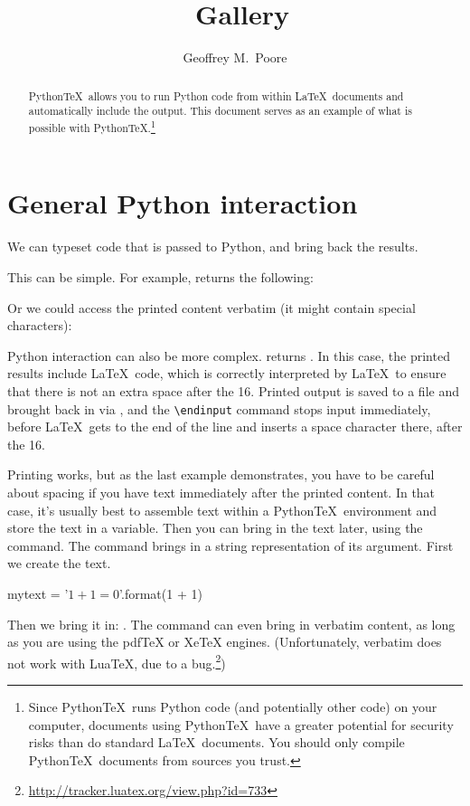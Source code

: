 \documentclass[11pt]{article}
\title{\pytex\ Gallery}
\author{Geoffrey M.\ Poore}
\newcommand{\pytex}{Python\TeX}
\begin{document}
\maketitle


\begin{abstract}
\pytex\ allows you to run Python code from within \LaTeX\ documents and automatically include the output.  This document serves as an example of what is possible with \pytex.\footnote{Since \pytex\ runs Python code (and potentially other code) on your computer, documents using \pytex\ have a greater potential for security risks than do standard \LaTeX\ documents.  You should only compile \pytex\ documents from sources you trust.}
\end{abstract}



\section{General Python interaction}

We can typeset code that is passed to Python, and bring back the results.

This can be simple.  For example,  returns the following:
\begin{quote}
\printpythontex
\end{quote}

Or we could access the printed content verbatim (it might contain special characters):
\begin{quote}
\printpythontex[verb]
\end{quote}




Python interaction can also be more complex.   returns \printpythontex.  In this case, the printed results include \LaTeX\ code, which is correctly interpreted by \LaTeX\ to ensure that there is not an extra space after the 16.  Printed output is saved to a file and brought back in via \verb||, and the \verb|\endinput| command stops input immediately, before \LaTeX\ gets to the end of the line and inserts a space character there, after the 16.

Printing works, but as the last example demonstrates, you have to be careful about spacing if you have text immediately after the printed content.  In that case, it's usually best to assemble text within a \pytex\ environment and store the text in a variable.  Then you can bring in the text later, using the  command.  The  command brings in a string representation of its argument.  First we create the text.
\begin{pyblock}
mytext = '$1 + 1 = {0}$'.format(1 + 1)
\end{pyblock}
Then we bring it in:  .  The  command can even bring in verbatim content, as long as you are using the pdfTeX or XeTeX engines.  (Unfortunately, verbatim does not work with LuaTeX, due to a bug.\footnote{\url{http://tracker.luatex.org/view.php?id=733}})
\end{document}
